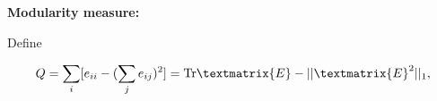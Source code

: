   



  \textbf{Modularity measure:}
    
     
      Define 
    

    $$  
    Q = 
    \sum_{i}
    [e_{ii} - (\sum_j e_{ij})^2]
    =
    {\textnormal{Tr}} \textmatrix{E} - || \textmatrix{E}^2 ||_1,
    $$
  



\begin{comment}



  Structure detection:

  From Lipari summer school:


jure leskovec:

bipartite affiliation graph model

community detection

affiliation graph model


Add Louvain method

Limits of modularity:

Can fail for random graphs.

Spinglass models

Look at fluctuations of modularity.

Resolution limit
Fortunato and Barthelemy, 2007

Infomap (Rosvall and Bergstrom, 2008)
Random walks and geometric maps


Methods for finding overlapping communities.

Clique percolation method.

How to test clustering algorithms.

LFR benchmark
lancichinetti et al 2008

Mutual information

Danon et al. (2005) using GN benchmark




  Include Romu's famous paper

  Add Callaway to random networks
  Point out growing mechanism.

  Move Newman's generating function madness to 
  the end of assortativity.

  Add our work?


  Glock's paper



\end{comment}
